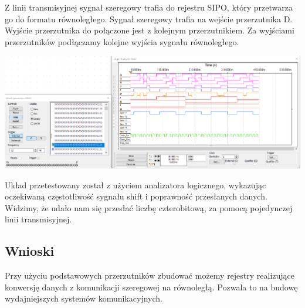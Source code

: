 \documentclass{article}
\begin{document}
            Z linii transmisyjnej sygnał szeregowy trafia do rejestru SIPO, który przetwarza go do formatu równoległego. Sygnał szeregowy trafia na wejście przerzutnika D. Wyjście przerzutnika do połączone jest z kolejnym przerzutnikiem. Za wyjściami przerzutników podłączamy kolejne wyjścia sygnału równoległego.  
            
            \begin{center}
                \includegraphics[width=18cm]{reports/img/Z2C_2.png}\\
            \end{center}
            Układ przetestowany został z użyciem analizatora logicznego, wykazując oczekiwaną częstotliwość sygnału shift i poprawność przesłanych danych. Widzimy, że udało nam się przesłać liczbę czterobitową, za pomocą pojedynczej linii transmisyjnej. 
            
        \subsection{Wnioski}
            Przy użyciu podstawowych przerzutników zbudować możemy rejestry realizujące konwersję danych z komunikacji szeregowej na równoległą. Pozwala to na budowę wydajniejszych systemów komunikacyjnych.
\end{document}
